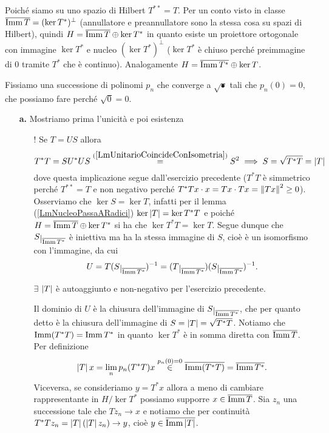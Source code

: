 \documentclass[a4paper]{article}
\begin{document}
\begin{solution}
Poich\'e siamo su uno spazio di Hilbert $T^{\ast\ast}=T$.
Per un conto visto in classe $\overline{\operatorname{Imm} T}=(\ker T^\ast)^\perp$ (annullatore e preannullatore sono la stessa cosa su spazi di Hilbert), quindi $H=\overline{\operatorname{Imm} T}\oplus \ker T^\ast$ in quanto esiste un proiettore ortogonale con immagine $\ker T^\ast$ e nucleo $(\ker T^\ast)^\perp$ ($\ker T^\ast$ \`e chiuso perch\'e preimmagine di $0$ tramite $T^\ast$ che \`e continuo). 
Analogamente $H=\overline{\operatorname{Imm} T^\ast}\oplus \ker T$.

Fissiamo una successione di polinomi $p_n$ che converge a $\sqrt\bullet$ tali che $p_n(0)=0$, che possiamo fare perch\'e $\sqrt0=0$.
\setlength{\leftmargini}{0cm}
\begin{enumerate}
\item [\textbf{a.}] Mostriamo prima l'unicit\`a e poi esistenza
\begin{itemize}
\item[$\boxed{!}$] Se $T=US$ allora
\[T^\ast T=SU^\ast US\overset{(\ref{LmUnitarioCoincideConIsometria})}=S^2\implies S=\sqrt{T^\ast T}=\left|{T}\right|\]
dove questa implicazione segue dall'esercizio precedente ($T^\ast T$ \`e simmetrico perch\'e $T^{\ast\ast}=T$ e non negativo perch\'e $T^\ast Tx\cdot x=Tx\cdot Tx=\left\Vert{Tx}\right\Vert^2\geq 0$). Osserviamo che $\ker S=\ker T$, infatti per il lemma (\ref{LmNucleoPassaARadici}) $\ker\left|{T}\right|=\ker T^\ast T$ e poich\'e $H=\overline{\operatorname{Imm} T}\oplus \ker T^\ast$ si ha che $\ker T^\ast T=\ker T$. Segue dunque che $S\res{\ol{\imm T^\ast}}$ \`e iniettiva ma ha la stessa immagine di $S$, cio\`e \`e un isomorfismo con l'immagine, da cui
\[U=T(S\res{\ol{\imm T^\ast}})\ii=(T\res{\ol{\imm T^\ast}})(S\res{\ol{\imm T^\ast}})\ii.\]
\item[$\boxed{\exists}$] $\left|{T}\right|$ \`e autoaggiunto e non-negativo per l'esercizio precedente.

Il dominio di $U$ \`e la chiusura dell'immagine di $S\res{\ol{\imm T^\ast}}$, che per quanto detto \`e la chiusura dell'immagine di $S=\left|{T}\right|=\sqrt{T^\ast T}$. Notiamo che $\operatorname{Imm}(T^\ast T)=\operatorname{Imm} T^\ast$ in quanto $\ker T^\ast$ \`e in somma diretta con $\overline{\operatorname{Imm} T}$. Per definizione 
\[\left|{T}\right|x=\lim_np_n(T^\ast T)x\overset{p_n(0)=0}\in \overline{\operatorname{Imm} (T^\ast T)}=\overline{\operatorname{Imm} T^\ast}.\]
Viceversa, se consideriamo $y=T^\ast x$ allora a meno di cambiare rappresentante in $H/\ker T^\ast$ possiamo supporre $x\in \overline{\operatorname{Imm} T}$. Sia $z_n$ una successione tale che $Tz_n\to x$ e notiamo che per continuit\`a $T^\ast Tz_n=\left|{T}\right|(\left|{T}\right|z_n)\to y$, cio\`e $y\in \overline{\operatorname{Imm} \left|{T}\right|}$.



\end{itemize}
\end{enumerate}
\end{solution}
\end{document}
